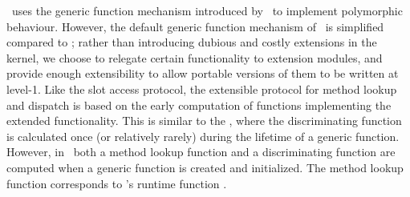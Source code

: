 %
\begin{optRationale}
\telos\ uses the generic function mechanism introduced by \clos\ to
implement polymorphic behaviour.  However, the default generic function
mechanism of \telos\ is simplified compared to \clos; rather than
introducing dubious and costly extensions in the kernel, we choose to
relegate certain functionality to extension modules, and provide
enough extensibility to allow portable versions of them to be written at
level-1.
Like the slot access protocol, the extensible protocol for method
lookup and dispatch is based on the early computation of functions
implementing the extended functionality.  This is similar to the
\closmop, where the discriminating function is calculated once (or
relatively rarely) during the lifetime of a generic function.
However, in \telos\ both a method lookup function and a discriminating
function are computed when a generic function is created and
initialized.  The method lookup function corresponds to \clos's
runtime function .
\end{optRationale}

